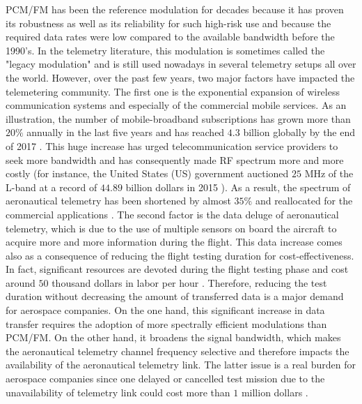 PCM/FM has been the reference modulation for decades \cite{irig106} because it has proven its robustness as well as its reliability for such high-risk use and because the required data rates were low compared to the available bandwidth before the 1990's. In the telemetry literature, this modulation is sometimes called the "legacy modulation" and is still used nowadays in several telemetry setups all over the world.  However, over the past few years, two major factors have impacted the telemetering community. The first one is the exponential expansion of wireless communication systems and especially of the commercial mobile services. As an illustration, the number of mobile-broadband subscriptions has grown more than $20\%$ annually in the last five years and has reached $4.3$ billion globally by the end of 2017 \cite{itu_facts}. This huge increase has urged telecommunication service providers to seek more bandwidth and has consequently made RF spectrum more and more costly (for instance, the United States (US) government auctioned $25$ MHz of the L-band at a record of $44.89$ billion dollars in 2015 \cite{spec_pr}). As a result, the spectrum of aeronautical telemetry has been shortened by almost $35\%$ and reallocated for the commercial applications \cite{ninja_telem}.\newline  
The second factor is the data deluge of aeronautical telemetry, which is due to the use of multiple sensors on board the aircraft to acquire more and more information during the flight. This data increase comes also as a consequence of reducing the flight testing duration for cost-effectiveness. In fact, significant resources are devoted during the flight testing phase and cost around $50$ thousand dollars in labor per hour \cite{telemetry_eco, eco_imp_tel}. Therefore, reducing the test duration without decreasing the amount of transferred data is a major demand for aerospace companies. On the one hand, this significant increase in data transfer requires the adoption of more spectrally efficient modulations than PCM/FM. On the other hand, it broadens the signal bandwidth, which makes the aeronautical telemetry channel frequency selective \cite{channel_wideband} and therefore impacts the availability of the aeronautical telemetry link. The latter issue is a real burden for aerospace companies since one delayed or cancelled test mission due to the unavailability of telemetry link could cost more than $1$ million dollars \cite{eco_imp_tel}.        

